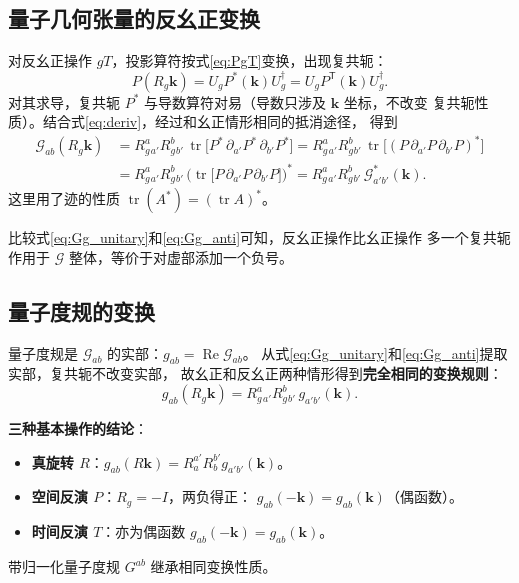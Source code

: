 \subsection{量子几何张量的反幺正变换}

对反幺正操作 \(gT\)，投影算符按式\eqref{eq:PgT}变换，出现复共轭：
\[
  P(R_g\mathbf{k}) = U_g P^*(\mathbf{k}) U_g^\dagger
  = U_g P^{\mathsf{T}}(\mathbf{k}) U_g^\dagger .
\]
对其求导，复共轭 \(P^*\) 与导数算符对易（导数只涉及 \(\mathbf{k}\) 坐标，不改变
复共轭性质）。结合式\eqref{eq:deriv}，经过和幺正情形相同的抵消途径，
得到
\begin{align}
  \mathcal{G}_{ab}(R_g\mathbf{k})
  &= R_g^{a}{}_{a'} R_g^{b}{}_{b'}\,
     \operatorname{tr}\bigl[ P^*\,\partial_{a'}P^*\,\partial_{b'}P^* \bigr]
   = R_g^{a}{}_{a'} R_g^{b}{}_{b'}\,
     \operatorname{tr}\bigl[ (P\,\partial_{a'}P\,\partial_{b'}P)^* \bigr] \nonumber\\
  &= R_g^{a}{}_{a'} R_g^{b}{}_{b'}\,
     \bigl( \operatorname{tr}\bigl[ P\,\partial_{a'}P\,\partial_{b'}P \bigr] \bigr)^*
   = R_g^{a}{}_{a'} R_g^{b}{}_{b'}\, \mathcal{G}_{a'b'}^*(\mathbf{k}) .
  \label{eq:Gg_anti}
\end{align}
这里用了迹的性质 \(\operatorname{tr}(A^*) = (\operatorname{tr} A)^*\)。

比较式\eqref{eq:Gg_unitary}和\eqref{eq:Gg_anti}可知，反幺正操作比幺正操作
多一个复共轭作用于 \(\mathcal{G}\) 整体，等价于对虚部添加一个负号。

\subsection{量子度规的变换}

量子度规是 \(\mathcal{G}_{ab}\) 的实部：\(g_{ab} = \operatorname{Re}\mathcal{G}_{ab}\)。
从式\eqref{eq:Gg_unitary}和\eqref{eq:Gg_anti}提取实部，复共轭不改变实部，
故幺正和反幺正两种情形得到\textbf{完全相同的变换规则}：
\begin{equation}
{g_{ab}(R_g\mathbf{k}) = R_g^{a}{}_{a'} R_g^{b}{}_{b'}\,g_{a'b'}(\mathbf{k}) } .
\end{equation}

\textbf{三种基本操作的结论}：
\begin{itemize}
  \item \textbf{真旋转 \(R\)}：\(g_{ab}(R\mathbf{k}) = R_a^{a'}R_b^{b'}g_{a'b'}(\mathbf{k})\)。
  \item \textbf{空间反演 \(P\)}：\(R_g=-I\)，两负得正：
        \(g_{ab}(-\mathbf{k}) = g_{ab}(\mathbf{k})\)（偶函数）。
  \item \textbf{时间反演 \(T\)}：亦为偶函数
        \(g_{ab}(-\mathbf{k}) = g_{ab}(\mathbf{k})\)。
\end{itemize}
带归一化量子度规 \(G^{ab}\) 继承相同变换性质。

